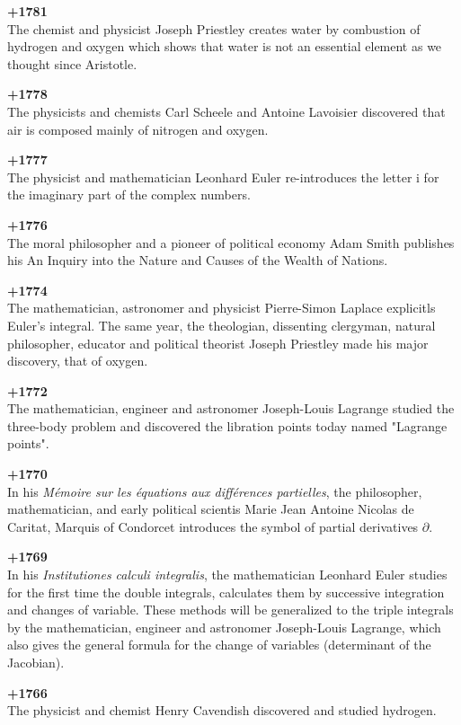 \textbf{+1781}\\
The chemist and physicist Joseph Priestley creates water by combustion of hydrogen and oxygen which shows that water is not an essential element as we thought since Aristotle.

\textbf{+1778}\\
The physicists and chemists Carl Scheele and Antoine Lavoisier discovered that air is composed mainly of nitrogen and oxygen.

\textbf{+1777}\\
The physicist and mathematician Leonhard Euler re-introduces the letter $\mathrm{i}$ for the imaginary part of the complex numbers.

\textbf{+1776}\\
The moral philosopher and a pioneer of political economy Adam Smith publishes his An Inquiry into the Nature and Causes of the Wealth of Nations.

\textbf{+1774}\\
The mathematician, astronomer and physicist Pierre-Simon Laplace explicitls Euler's integral. The same year, the theologian, dissenting clergyman, natural philosopher, educator and political theorist Joseph Priestley made his major discovery, that of oxygen.

\textbf{+1772}\\
The mathematician, engineer and astronomer Joseph-Louis Lagrange studied the three-body problem and discovered the libration points today named "Lagrange points".

\textbf{+1770}\\
In his \textit{Mémoire sur les équations aux différences partielles}, the philosopher, mathematician, and early political scientis Marie Jean Antoine Nicolas de Caritat, Marquis of Condorcet introduces the symbol of partial derivatives $\partial$.

\textbf{+1769}\\
In his \textit{Institutiones calculi integralis}, the mathematician Leonhard Euler studies for the first time the double integrals, calculates them by successive integration and changes of variable. These methods will be generalized to the triple integrals by the mathematician, engineer and astronomer Joseph-Louis Lagrange, which also gives the general formula for the change of variables (determinant of the Jacobian).

\textbf{+1766}\\
The physicist and chemist Henry Cavendish discovered and studied hydrogen.

